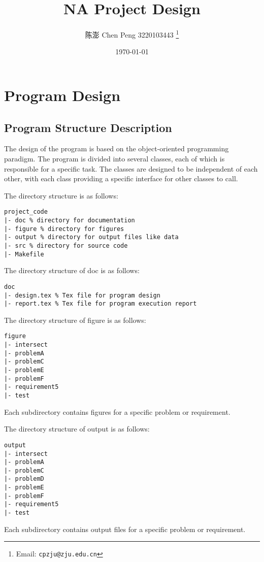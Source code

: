 \documentclass[a4paper]{article}
\begin{document}
\begin{sloppypar}
\title{NA Project Design}

\author{陈澎 Chen Peng 3220103443
  \thanks{Email: \texttt{cpzju@zju.edu.cn}}}

\date{\today}

\maketitle

\section{Program Design}
\subsection{Program Structure Description}
The design of the program is based on the object-oriented programming paradigm.
The program is divided into several classes, each of which is responsible for a
specific task. The classes are designed to be independent of each other, with
each class providing a specific interface for other classes to call.

The directory structure is as follows:
\begin{lstlisting}
project_code
|- doc % directory for documentation
|- figure % directory for figures
|- output % directory for output files like data
|- src % directory for source code
|- Makefile
\end{lstlisting}

The directory structure of doc is as follows:
\begin{lstlisting}
doc
|- design.tex % Tex file for program design
|- report.tex % Tex file for program execution report
\end{lstlisting}

The directory structure of figure is as follows:
\begin{lstlisting}
figure
|- intersect
|- problemA
|- problemC
|- problemE
|- problemF
|- requirement5
|- test
\end{lstlisting}
Each subdirectory contains figures for a specific problem or requirement.

The directory structure of output is as follows:
\begin{lstlisting}
output
|- intersect
|- problemA
|- problemC
|- problemD
|- problemE
|- problemF
|- requirement5
|- test
\end{lstlisting}
Each subdirectory contains output files for a specific problem or requirement.


\end{sloppypar}
\end{document}
